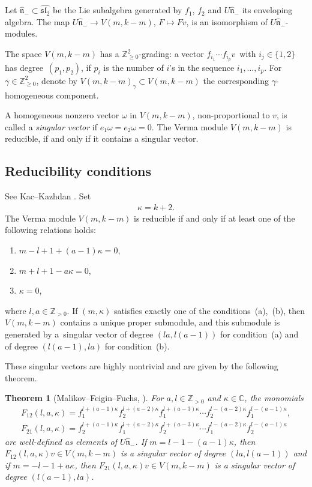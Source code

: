 \documentclass[11pt]{article}
\numberwithin{equation}{section}
\newtheorem{thm}{Theorem}[section]
\begin{document}
Let $\hat{\mathfrak{n}}_-\subset\widehat{{\mathfrak{sl}_2}}$ be the Lie subalgebra generated by $f_1$, $f_2$ and $U\hat{\mathfrak{n}}_-$ its enveloping algebra. The map $U\hat{\mathfrak{n}}_-\to V(m,k-m)$, $F\mapsto Fv$, is an isomorphism of $U\hat{\mathfrak{n}}_-$-modules.

The space $V(m,k-m)$ has a ${\mathbb Z}^2_{\geq 0}$-grading: a vector $f_{i_1}\cdots f_{i_p}v$\ with $i_j\in\{1,2\}$ has deg\-ree~$(p_1,p_2)$, if $p_i$ is the number of $i$'s in the sequence $i_1,\dots,i_p$. For $\gamma\in{\mathbb Z}^2_{\geq 0}$, denote by $V(m,k-m)_{\gamma}\subset V(m,k-m)$ the corresponding $\gamma$-homogeneous component.

A homogeneous nonzero vector $\omega$ in $V(m,k-m)$, non-proportional to $v$, is called a {\em singular vector} if $e_1\omega=e_2\omega=0$. The Verma module $V(m,k-m)$ is reducible, if and only if it contains a singular vector.

\subsection{Reducibility conditions}\label{reduc}
See Kac--Kazhdan \cite{KK}. Set
\begin{gather*}
\kappa=k+2.
\end{gather*}
The Verma module $V(m,k-m)$ is reducible if and only if at least one of the following relations holds:
\begin{enumerate}\itemsep=0pt
\item[(a)] $m-l+1+(a-1)\kappa=0$,
\item[(b)] $m+l+1-a\kappa=0$,
\item[(c)] $\kappa=0$,
\end{enumerate}
where $l,a\in{\mathbb Z}_{>0}$. If $(m,\kappa)$ satisfies exactly one of the conditions~(a),~(b), then $V(m,k-m)$ contains a unique proper submodule, and this submodule is generated by a~singular vector of degree $(la,l(a-1))$ for condition~(a) and of degree $(l(a-1),la)$ for condition~(b).

These singular vectors are highly nontrivial and are given by the following theorem.

\begin{thm}[{Malikov--Feigin--Fuchs, \cite{MFF}}]\label{thm MFF} For $a, l\in{\mathbb Z}_{>0}$ and $\kappa\in {\mathbb C}$, the monomials
\begin{gather*}
F_{12}(l,a,\kappa) = f_1^{l+(a-1)\kappa}f_2^{l+(a-2)\kappa} f_1^{l+(a-3)\kappa}\cdots f_2^{l-(a-2)\kappa} f_1^{l-(a-1)\kappa}, \\ %
F_{21}(l,a,\kappa) = f_2^{l+(a-1)\kappa}f_1^{l+(a-2)\kappa} f_2^{l+(a-3)\kappa}\cdots f_1^{l-(a-2)\kappa} f_2^{l-(a-1)\kappa} \nonumber
\end{gather*}
are well-defined as elements of $U\hat{\mathfrak{n}}_-$. If $m=l-1-(a-1)\kappa$, then $F_{12}(l,a,\kappa)v\in V(m,k-m)$ is a singular vector of degree $(la,l(a-1))$ and if $m=-l-1+a\kappa$, then $F_{21}(l,a,\kappa)v\in V(m,k-m)$ is a singular vector of degree $(l(a-1),la)$.
\end{thm}
\end{document}
